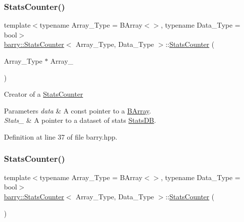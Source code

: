 \subsubsection{\texorpdfstring{Stats\+Counter()}{StatsCounter()}\hspace{0.1cm}{\footnotesize\ttfamily [1/2]}}
{\footnotesize\ttfamily template$<$typename Array\+\_\+\+Type  = B\+Array$<$$>$, typename Data\+\_\+\+Type  = bool$>$ \\
\hyperlink{classbarry_1_1_stats_counter}{barry\+::\+Stats\+Counter}$<$ Array\+\_\+\+Type, Data\+\_\+\+Type $>$\+::\hyperlink{classbarry_1_1_stats_counter}{Stats\+Counter} (\begin{DoxyParamCaption}\item[{Array\+\_\+\+Type $\ast$}]{Array\+\_\+ }\end{DoxyParamCaption})\hspace{0.3cm}{\ttfamily [inline]}}



Creator of a {\ttfamily \hyperlink{classbarry_1_1_stats_counter}{Stats\+Counter}} 


\begin{DoxyParams}{Parameters}
{\em data} & A const pointer to a {\ttfamily \hyperlink{classbarry_1_1_b_array}{B\+Array}}. \\
\hline
{\em Stats\+\_\+} & A pointer to a dataset of stats {\ttfamily \hyperlink{classbarry_1_1_stats_d_b}{Stats\+DB}}. \\
\hline
\end{DoxyParams}


Definition at line 37 of file barry.\+hpp.

\mbox{\label{classbarry_1_1_stats_counter_a407df1580b207faac92c476c7062b840}} 
\subsubsection{\texorpdfstring{Stats\+Counter()}{StatsCounter()}\hspace{0.1cm}{\footnotesize\ttfamily [2/2]}}
{\footnotesize\ttfamily template$<$typename Array\+\_\+\+Type  = B\+Array$<$$>$, typename Data\+\_\+\+Type  = bool$>$ \\
\hyperlink{classbarry_1_1_stats_counter}{barry\+::\+Stats\+Counter}$<$ Array\+\_\+\+Type, Data\+\_\+\+Type $>$\+::\hyperlink{classbarry_1_1_stats_counter}{Stats\+Counter} (\begin{DoxyParamCaption}{ }\end{DoxyParamCaption})\hspace{0.3cm}{\ttfamily [inline]}}



